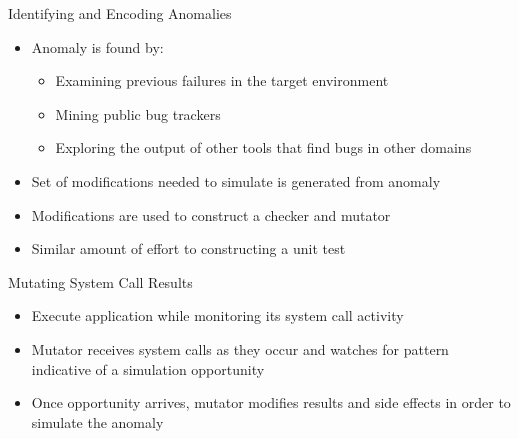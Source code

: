 \documentclass[pdf]{beamer}
\begin{document}
\begin{frame}{Identifying and Encoding Anomalies}
  \begin{itemize}
    \item{Anomaly is found by:}
      \begin{itemize}
        \item{Examining previous failures in the target environment}
        \item{Mining public bug trackers}
        \item{Exploring the output of other tools that find bugs in other
          domains}
      \end{itemize}
    \item{Set of modifications needed to simulate is generated from anomaly}
    \item{Modifications are used to construct a checker and mutator}
    \item{Similar amount of effort to constructing a unit test}
  \end{itemize}
\end{frame}


\begin{frame}{Mutating System Call Results}
  \begin{itemize}
    \item{Execute application while monitoring its system call activity}
    \item{Mutator receives system calls as they occur and watches for pattern
      indicative of a simulation opportunity}
    \item{Once opportunity arrives, mutator modifies results and side effects
      in order to simulate the anomaly}
  \end{itemize}
\end{frame}
\end{document}

